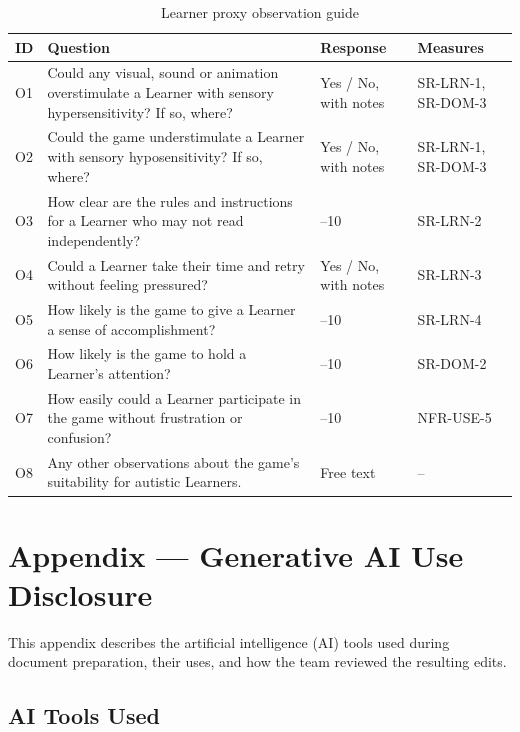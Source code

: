 \documentclass[12pt, titlepage]{article}
\newcommand{\srsref}[1]{#1}
\begin{document}
\begin{table}[htbp]
\centering\small
\caption{Learner proxy observation guide}
\label{tab:proxy-guide}
\renewcommand{\arraystretch}{1.2}
\begin{tabularx}{\textwidth}{l >{\raggedright\arraybackslash}X >{\raggedright\arraybackslash}p{} >{\raggedright\arraybackslash}p{}}
\toprule
\textbf{ID} & \textbf{Question} & \textbf{Response} & \textbf{Measures}\\
\midrule
O1 & Could any visual, sound or animation overstimulate a Learner with sensory hypersensitivity? If so, where? & Yes / No, with notes & \srsref{SR-LRN-1}, \srsref{SR-DOM-3}\\
O2 & Could the game understimulate a Learner with sensory hyposensitivity? If so, where? & Yes / No, with notes & \srsref{SR-LRN-1}, \srsref{SR-DOM-3}\\
O3 & How clear are the rules and instructions for a Learner who may not read independently? & 1--10 & \srsref{SR-LRN-2}\\
O4 & Could a Learner take their time and retry without feeling pressured? & Yes / No, with notes & \srsref{SR-LRN-3}\\
O5 & How likely is the game to give a Learner a sense of accomplishment? & 1--10 & \srsref{SR-LRN-4}\\
O6 & How likely is the game to hold a Learner's attention? & 1--10 & \srsref{SR-DOM-2}\\
O7 & How easily could a Learner participate in the game without frustration or confusion? & 1--10 & \srsref{NFR-USE-5}\\
O8 & Any other observations about the game's suitability for autistic Learners. & Free text & --\\
\bottomrule
\end{tabularx}
\end{table}


\newpage{}

\section{Appendix --- Generative AI Use Disclosure}

This appendix describes the artificial intelligence (AI) tools used during
document preparation, their uses, and how the team reviewed the resulting edits.

\subsection{AI Tools Used}
\end{document}
